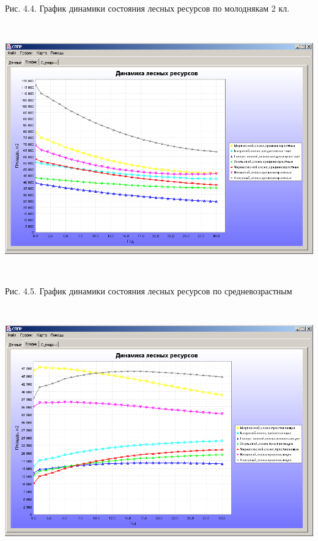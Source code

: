 \documentclass{article}
\begin{document}
\begin{center}
Рис. 4.4. График динамики состояния лесных ресурсов 
по молоднякам 2 кл.

\includegraphics[width=449pt, height=307pt, keepaspectratio=true]{asyaDisser9_3-fig016.png}

Рис. 4.5. График динамики состояния лесных ресурсов 
по средневозрастным

\includegraphics[width=449pt, height=307pt, keepaspectratio=true]{asyaDisser9_3-fig017.png}


\end{center}
\end{document}
